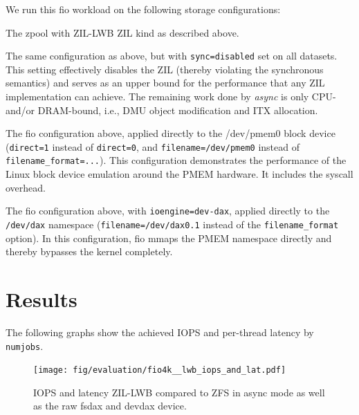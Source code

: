 \documentclass[12pt,a4paper,twoside]{book}
\begin{document}
{We run this fio workload on the following storage configurations:
\begin{description}[noitemsep,leftmargin=1.5cm,labelindent=1cm]
    \item[zil-lwb] The zpool with ZIL-LWB ZIL kind as described above.
    \item[async] The same configuration as above, but with \lstinline{sync=disabled} set on all datasets.
        This setting effectively disables the ZIL (thereby violating the synchronous semantics) and serves as an upper bound for the performance that any ZIL implementation can achieve.
        The remaining work done by \textit{async} is only CPU- and/or DRAM-bound, i.e.,  DMU object modification and ITX allocation.
    \item[fsdax] The fio configuration above, applied directly to the /dev/pmem0 block device (\lstinline{direct=1} instead of \lstinline{direct=0}, and \lstinline{filename=/dev/pmem0} instead of \lstinline{filename_format=...}).
        This configuration demonstrates the performance of the Linux block device emulation around the PMEM hardware. It includes the syscall overhead.
    \item[devdax] The fio configuration above, with \lstinline{ioengine=dev-dax}, applied directly to the \texttt{/dev/dax} namespace (\lstinline{filename=/dev/dax0.1} instead of the \lstinline{filename_format} option).
        In this configuration, fio mmaps the PMEM namespace directly and thereby bypasses the kernel completely.
\end{description}

\section{Results}\label{ch:lwb_analysis:results}

The following graphs show the achieved IOPS and per-thread latency by \lstinline{numjobs}.

\begin{figure}[H]
    \centering
    \texttt{[image: fig/evaluation/fio4k\_\_lwb\_iops\_and\_lat.pdf]}
    \caption{IOPS and latency ZIL-LWB compared to ZFS in async mode as well as the raw fsdax and devdax device.}
    \label{fig:lwbanalysis:iops_and_latency}
\end{figure}

}
\end{document}
